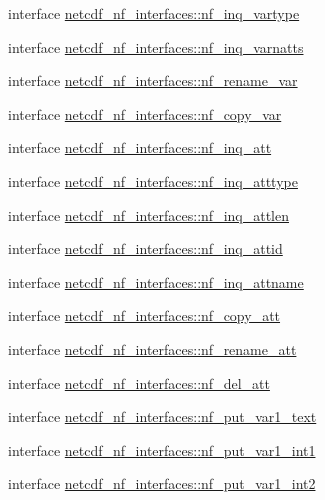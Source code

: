 \begin{DoxyCompactItemize}
\item 
interface \hyperlink{interfacenetcdf__nf__interfaces_1_1nf__inq__vartype}{netcdf\+\_\+nf\+\_\+interfaces\+::nf\+\_\+inq\+\_\+vartype}
\item 
interface \hyperlink{interfacenetcdf__nf__interfaces_1_1nf__inq__varnatts}{netcdf\+\_\+nf\+\_\+interfaces\+::nf\+\_\+inq\+\_\+varnatts}
\item 
interface \hyperlink{interfacenetcdf__nf__interfaces_1_1nf__rename__var}{netcdf\+\_\+nf\+\_\+interfaces\+::nf\+\_\+rename\+\_\+var}
\item 
interface \hyperlink{interfacenetcdf__nf__interfaces_1_1nf__copy__var}{netcdf\+\_\+nf\+\_\+interfaces\+::nf\+\_\+copy\+\_\+var}
\item 
interface \hyperlink{interfacenetcdf__nf__interfaces_1_1nf__inq__att}{netcdf\+\_\+nf\+\_\+interfaces\+::nf\+\_\+inq\+\_\+att}
\item 
interface \hyperlink{interfacenetcdf__nf__interfaces_1_1nf__inq__atttype}{netcdf\+\_\+nf\+\_\+interfaces\+::nf\+\_\+inq\+\_\+atttype}
\item 
interface \hyperlink{interfacenetcdf__nf__interfaces_1_1nf__inq__attlen}{netcdf\+\_\+nf\+\_\+interfaces\+::nf\+\_\+inq\+\_\+attlen}
\item 
interface \hyperlink{interfacenetcdf__nf__interfaces_1_1nf__inq__attid}{netcdf\+\_\+nf\+\_\+interfaces\+::nf\+\_\+inq\+\_\+attid}
\item 
interface \hyperlink{interfacenetcdf__nf__interfaces_1_1nf__inq__attname}{netcdf\+\_\+nf\+\_\+interfaces\+::nf\+\_\+inq\+\_\+attname}
\item 
interface \hyperlink{interfacenetcdf__nf__interfaces_1_1nf__copy__att}{netcdf\+\_\+nf\+\_\+interfaces\+::nf\+\_\+copy\+\_\+att}
\item 
interface \hyperlink{interfacenetcdf__nf__interfaces_1_1nf__rename__att}{netcdf\+\_\+nf\+\_\+interfaces\+::nf\+\_\+rename\+\_\+att}
\item 
interface \hyperlink{interfacenetcdf__nf__interfaces_1_1nf__del__att}{netcdf\+\_\+nf\+\_\+interfaces\+::nf\+\_\+del\+\_\+att}
\item 
interface \hyperlink{interfacenetcdf__nf__interfaces_1_1nf__put__var1__text}{netcdf\+\_\+nf\+\_\+interfaces\+::nf\+\_\+put\+\_\+var1\+\_\+text}
\item 
interface \hyperlink{interfacenetcdf__nf__interfaces_1_1nf__put__var1__int1}{netcdf\+\_\+nf\+\_\+interfaces\+::nf\+\_\+put\+\_\+var1\+\_\+int1}
\item 
interface \hyperlink{interfacenetcdf__nf__interfaces_1_1nf__put__var1__int2}{netcdf\+\_\+nf\+\_\+interfaces\+::nf\+\_\+put\+\_\+var1\+\_\+int2}

\end{DoxyCompactItemize}

